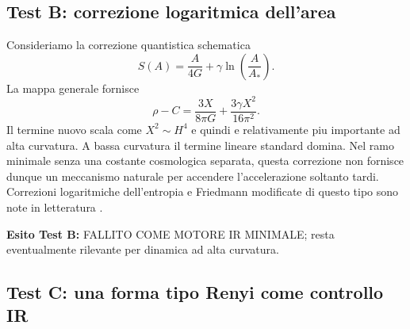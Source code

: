 \documentclass[11pt,a4paper]{article}
\newcommand{\status}[1]{\textsf{#1}}
\begin{document}
\subsection{Test B: correzione logaritmica dell'area}

Consideriamo la correzione quantistica schematica
\begin{equation}
 S(A)=\frac{A}{4G}+\gamma\ln\!\left(\frac{A}{A_*}\right).
\end{equation}
La mappa generale fornisce
\begin{equation}
 \boxed{\rho-C=\frac{3X}{8\pi G}+\frac{3\gamma X^2}{16\pi^2}.}
 \label{eq:log_entropy_friedmann}
\end{equation}
Il termine nuovo scala come $X^2\sim H^4$ e quindi e relativamente piu importante ad alta curvatura. A bassa curvatura il termine lineare standard domina. Nel ramo minimale senza una costante cosmologica separata, questa correzione non fornisce dunque un meccanismo naturale per accendere l'accelerazione soltanto tardi. Correzioni logaritmiche dell'entropia e Friedmann modificate di questo tipo sono note in letteratura \cite{CaiCaoHu2008}.

\textbf{Esito Test B:} \status{FALLITO COME MOTORE IR MINIMALE}; resta eventualmente rilevante per dinamica ad alta curvatura.

\subsection{Test C: una forma tipo Renyi come controllo IR}
\end{document}
